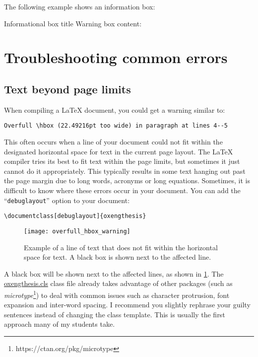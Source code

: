 The following example shows an information box:


\begin{OxInfoBox}{Informational box title}
Warning box content: \lipsum[1]
\end{OxInfoBox}


\section{Troubleshooting common errors}


\subsection{Text beyond page limits}


When compiling a LaTeX document, you could get a warning similar to:


\begin{lstlisting}[style=custom-text]
Overfull \hbox (22.49216pt too wide) in paragraph at lines 4--5
\end{lstlisting}


This often occurs when a line of your document could not fit within the designated horizontal space for text in the current page layout. The LaTeX compiler tries its best to fit text within the page limits, but sometimes it just cannot do it appropriately. This typically results in some text hanging out past the page margin due to long words, acronyms or long equations. Sometimes, it is difficult to know where these errors occur in your document. You can add the ``\verb|debuglayout|'' option to your document:


\begin{lstlisting}[style=custom-latex]
\documentclass[debuglayout]{oxengthesis}
\end{lstlisting}


\begin{figure}[htb]
    \centering
    \texttt{[image: overfull\_hbox\_warning]}
    \caption[Example of a line of text that does not fit within the horizontal space for text]
    {
        Example of a line of text that does not fit within the horizontal space for text. A black box is shown next to the affected line.
        \label{fig:ch0:overfull_hbox_warning}
    }
\end{figure}


A black box will be shown next to the affected lines, as shown in \cref{fig:ch0:overfull_hbox_warning}. The \url{oxengthesis.cls} class file already takes advantage of other packages (such as \textit{microtype}\footnote{https://ctan.org/pkg/microtype}) to deal with common issues such as character protrusion, font expansion and inter-word spacing. I recommend you slightly rephrase your guilty sentences instead of changing the class template. This is usually the first approach many of my students take.

